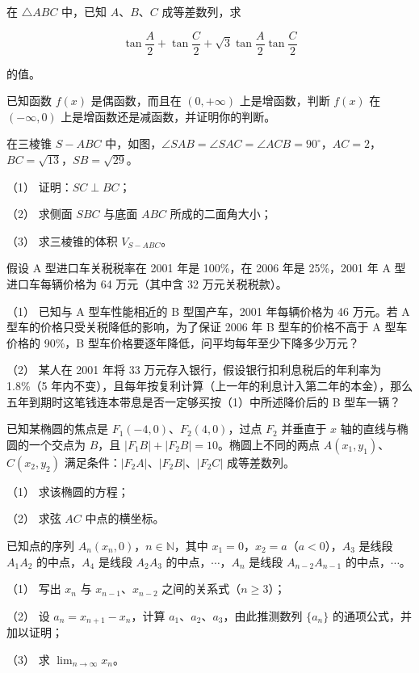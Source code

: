 \begin{question}
在 $\triangle ABC$ 中，已知 $A\text{、}B\text{、}C$ 成等差数列，求

\nopagebreak[4]
\[
\tan\frac A2+\tan\frac C2+\sqrt3\tan\frac A2\tan\frac C2
\]

的值。

\end{question}
\begin{question}
已知函数 $f(x)$ 是偶函数，而且在 $(0,+\infty)$ 上是增函数，判断 $f(x)$ 在 $(-\infty,0)$ 上是增函数还是减函数，并证明你的判断。

\Needspace{0.4\textheight}
\end{question}
\begin{question}
在三棱锥 $S-ABC$ 中，如图，$\angle SAB=\angle SAC=\angle ACB=90^\circ$，$AC=2$，$BC=\sqrt{13}$，$SB=\sqrt{29}$。
\nopagebreak[4]
\begin{center}\end{center}
\nopagebreak[4]
（1） 证明：$SC\perp BC$；

（2） 求侧面 $SBC$ 与底面 $ABC$ 所成的二面角大小；

（3） 求三棱锥的体积 $V_{S-ABC}$。

\end{question}
\begin{question}
假设 A 型进口车关税税率在 2001 年是 100\%，在 2006 年是 25\%，2001 年 A 型进口车每辆价格为 64 万元（其中含 32 万元关税税款）。

（1） 已知与 A 型车性能相近的 B 型国产车，2001 年每辆价格为 46 万元。若 A 型车的价格只受关税降低的影响，为了保证 2006 年 B 型车的价格不高于 A 型车价格的 90\%，B 型车价格要逐年降低，问平均每年至少下降多少万元？

（2） 某人在 2001 年将 33 万元存入银行，假设银行扣利息税后的年利率为 1.8\%（5 年内不变），且每年按复利计算（上一年的利息计入第二年的本金），那么五年到期时这笔钱连本带息是否一定够买按（1）中所述降价后的 B 型车一辆？

\end{question}
\begin{question}
已知某椭圆的焦点是 $F_1(-4,0)$、$F_2(4,0)$，过点 $F_2$ 并垂直于 $x$ 轴的直线与椭圆的一个交点为 $B$，且 $|F_1B|+|F_2B|=10$。椭圆上不同的两点 $A(x_1,y_1)$、$C(x_2,y_2)$ 满足条件：$|F_2A|\text{、}|F_2B|\text{、}|F_2C|$ 成等差数列。

（1） 求该椭圆的方程；

（2） 求弦 $AC$ 中点的横坐标。

\end{question}
\begin{question}
已知点的序列 $A_n(x_n,0)$，$n\in\mathbb N$，其中 $x_1=0$，$x_2=a$（$a<0$），$A_3$ 是线段 $A_1A_2$ 的中点，$A_4$ 是线段 $A_2A_3$ 的中点，$\cdots$，$A_n$ 是线段 $A_{n-2}A_{n-1}$ 的中点，$\cdots$。

（1） 写出 $x_n$ 与 $x_{n-1}\text{、}x_{n-2}$ 之间的关系式（$n\ge3$）；

（2） 设 $a_n=x_{n+1}-x_n$，计算 $a_1\text{、}a_2\text{、}a_3$，由此推测数列 $\{a_n\}$ 的通项公式，并加以证明；

（3） 求 $\displaystyle\lim_{n\to\infty}x_n$。

\end{question}